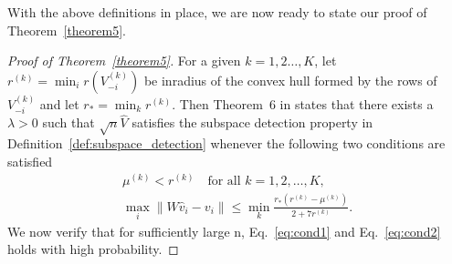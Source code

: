\documentclass[12pt]{article}
\begin{document}

With the above definitions in place, we are now ready to state our
proof of Theorem~\ref{theorem5}.

\begin{proof}[Proof of Theorem~\ref{theorem5}]
For a given $k = 1,2\dots,K$, let $r^{(k)} = \min_{i}r(V_{-i}^{(k)})$ be inradius of the convex hull formed by
the rows of $V_{-i}^{(k)}$ and let $r_* = \min_{k} r^{(k)}$. Then Theorem~6 in
\citet{jmlr-v28-wang13} states that there exists a $\lambda > 0$
such that $\sqrt{n} \hat{V}$ satisfies
the subspace detection property in
Definition~\ref{def:subspace_detection} whenever
the following two conditions are satisfied
\begin{gather}
  \label{eq:cond1}
  \mu^{(k)} < r^{(k)} \quad \text{for all $k = 1,2,\dots,K$}, \\
  \label{eq:cond2}
  \max_{i} \|W \hat{v}_{i} - v_{i}\| \leq \min_{k} \frac{r_*(r^{(k)} -
    \mu^{(k)})}{2 + 7 r^{(k)}}.
\end{gather}
We now verify that for sufficiently large n, Eq.~\eqref{eq:cond1} and Eq.~\eqref{eq:cond2}
holds with high probability.


\end{proof}
\end{document}
